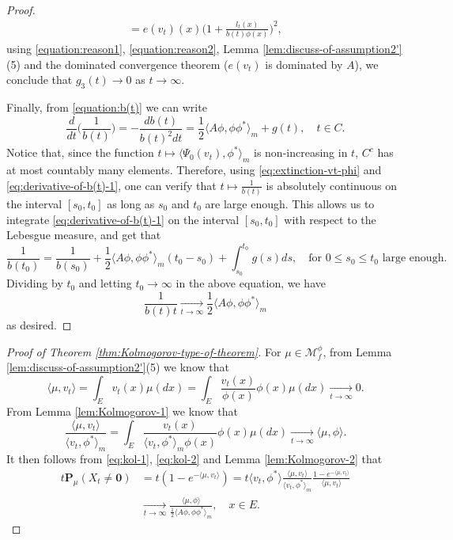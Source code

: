 \begin{proof}
\[\begin{split}
	= e(v_t)(x)\Big(1+\frac{l_t(x)}{ b(t) \phi(x)}\Big)^2,
\end{split}\]
	using \eqref{equation:reason1}, \eqref{equation:reason2}, Lemma \ref{lem:discuss-of-assumption2'}(5) and the dominated convergence theorem ($e(v_t)$ is dominated by $ A$), we conclude that $g_3(t)\to 0$ as $t\to\infty$.
\par
	Finally, from \eqref{equation:b(t)} we can write
\begin{equation}\label{eq:derivative-of-b(t)-1}
	\frac{d}{dt} \Big(\frac{1}{b(t)}\Big)
	= -\frac{d b(t)}{b(t)^2dt}
	= \frac{1}{2}\langle  A\phi,\phi\phi^*\rangle_m + g(t),
	\quad t\in C.
\end{equation}
	Notice that, since the function $t\mapsto \langle\Psi_0(v_t),\phi^*\rangle_m$ is non-increasing in $t$, $C^c$ has at most countably many elements.
	Therefore, using \eqref{eq:extinction-vt-phi} and \eqref{eq:derivative-of-b(t)-1}, one can verify that $t\mapsto \frac{1}{b(t)}$ is absolutely continuous on the interval $[s_0,t_0]$ as long as $s_0$ and $t_0$ are large enough.
	This allows us to integrate \eqref{eq:derivative-of-b(t)-1} on the interval $[s_0,t_0]$ with respect to the Lebesgue measure, and get that
\[
	\frac{1}{b(t_0)}
	= \frac{1}{b(s_0)} + \frac{1}{2}\langle A\phi,\phi\phi^*\rangle_m(t_0-s_0) + \int_{s_0}^{t_0} g(s)ds,
	\quad \text{for } 0\leq s_0\leq t_0 \text{ large enough}.
\]
	Dividing by $t_0$ and letting $t_0\to\infty$ in the above equation, we have
\[
	\frac{1}{b(t)t}
	\xrightarrow[t\to\infty]{} \frac{1}{2}\langle  A\phi,\phi\phi^*\rangle_m
\]
	as desired.
\end{proof}
\begin{proof}[Proof of Theorem \ref{thm:Kolmogorov-type-of-theorem}]
	For $\mu \in \mathcal M^\phi_f$, from Lemma \ref{lem:discuss-of-assumption2'}(5) we know that
\begin{equation}\label{eq:kol-1}
	\langle \mu ,v_t\rangle
    = \int_E v_t(x) \mu(dx)
	= \int_E \frac{v_t(x)}{\phi(x)} \phi(x)\mu(dx)
	\xrightarrow[t\to\infty]{} 0.
\end{equation}
	From Lemma \ref{lem:Kolmogorov-1} we know that
\begin{equation}\label{eq:kol-2}
     \frac {\langle\mu, v_t\rangle}{ \langle v_t,\phi^*\rangle_m}
	= \int_E \frac{v_t(x)}{\langle v_t, \phi^* \rangle_m \phi(x)}\phi(x)\mu(dx)
	\xrightarrow[t\to\infty]{} \langle \mu,\phi\rangle.
\end{equation}
	It then follows from \eqref{eq:kol-1}, \eqref{eq:kol-2} and Lemma \ref{lem:Kolmogorov-2} that
\[\begin{split}
	t\mathbf P_{\mu}(X_t\neq \mathbf 0)
	&= t (1-e^{-\langle \mu, v_t \rangle})
	= t \langle v_t,\phi^*\rangle\frac{\langle \mu,v_t\rangle }{\langle v_t,\phi^*\rangle_m} \frac {1-e^{-\langle \mu, v_t \rangle}} {\langle \mu, v_t \rangle}\\
	&\xrightarrow[t\to\infty]{} \frac{\langle \mu,\phi\rangle} {\frac{1}{2}\langle  A \phi,\phi \phi^*\rangle_m},
	\quad x\in E.
\end{split}\]
\end{proof}

